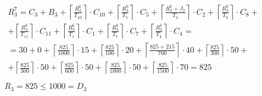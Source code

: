 \begin{gather*}
  \begin{multlined}
    R_3^7 = C_3 + B_3 + \left\lceil\frac{R_3^6}{T_{10}}\right\rceil\cdot C_{10} + %
    \left\lceil\frac{R_3^6}{T_5}\right\rceil\cdot C_5 + %
    \left\lceil\frac{R_3^6 + J_2}{T_2}\right\rceil\cdot C_2 + %
    \left\lceil\frac{R_3^6}{T_8}\right\rceil\cdot C_8 + \\%
    + \left\lceil\frac{R_3^6}{T_{11}}\right\rceil\cdot C_{11} + %
    \left\lceil\frac{R_3^6}{T_1}\right\rceil\cdot C_1 +%
    \left\lceil\frac{R_3^6}{T_7}\right\rceil\cdot C_7 +%
    \left\lceil\frac{R_3^6}{T_4}\right\rceil\cdot C_4 = \\%
    = 30 + 0 + \left\lceil\frac{825}{1000}\right\rceil\cdot 15 + %
    \left\lceil\frac{825}{100}\right\rceil\cdot 20 + %
    \left\lceil\frac{825 + 215}{700}\right\rceil\cdot 40 + %
    \left\lceil\frac{825}{300}\right\rceil\cdot 50 + \\%
    + \left\lceil\frac{825}{300}\right\rceil\cdot 50 + %
    \left\lceil\frac{825}{600}\right\rceil\cdot 50 + %
    \left\lceil\frac{825}{1000}\right\rceil\cdot 50 +%
    \left\lceil\frac{825}{1500}\right\rceil\cdot 70 = 825 \\
  \end{multlined} \\
  R_3 = 825 \le 1000 = D_3
\end{gather*}

